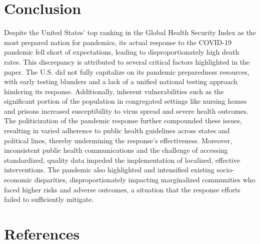 \documentclass[
  letterpaper,
  DIV=11,
  numbers=noendperiod]{scrartcl}
\begin{document}
\hypertarget{conclusion}{%
\section{Conclusion}\label{conclusion}}

Despite the United States' top ranking in the Global Health Security
Index as the most prepared nation for pandemics, its actual response to
the COVID-19 pandemic fell short of expectations, leading to
disproportionately high death rates. This discrepancy is attributed to
several critical factors highlighted in the paper. The U.S. did not
fully capitalize on its pandemic preparedness resources, with early
testing blunders and a lack of a unified national testing approach
hindering its response. Additionally, inherent vulnerabilities such as
the significant portion of the population in congregated settings like
nursing homes and prisons increased susceptibility to virus spread and
severe health outcomes. The politicization of the pandemic response
further compounded these issues, resulting in varied adherence to public
health guidelines across states and political lines, thereby undermining
the response's effectiveness. Moreover, inconsistent public health
communications and the challenge of accessing standardized, quality data
impeded the implementation of localized, effective interventions. The
pandemic also highlighted and intensified existing socio-economic
disparities, disproportionately impacting marginalized communities who
faced higher risks and adverse outcomes, a situation that the response
efforts failed to sufficiently mitigate.

\newpage

\hypertarget{references}{%
\section*{References}\label{references}}
\end{document}

